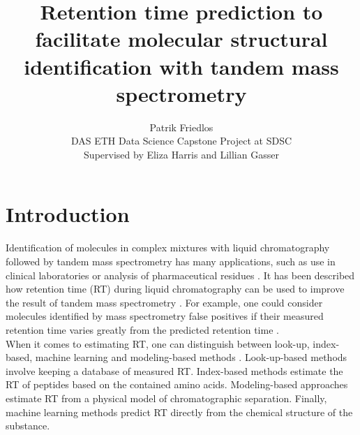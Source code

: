 \documentclass{article}
\title{Retention time prediction to facilitate molecular structural identification with tandem mass spectrometry}
\author{Patrik Friedlos\\
  \small DAS ETH Data Science Capstone Project at SDSC\\
  \small Supervised by Eliza Harris and Lillian Gasser
}
\theoremstyle{definition}
\theoremstyle{remark}
\begin{document}
\maketitle


\section{Introduction}

Identification of molecules in complex mixtures with liquid chromatography followed by tandem mass spectrometry has many applications, such as use in clinical laboratories or analysis of pharmaceutical residues \cite{van2012role, petrovic2005liquid}. It has been described how retention time (RT) during liquid chromatography can be used to improve the result of tandem mass spectrometry \cite{strittmatter2004application}. For example, one could consider molecules identified by mass spectrometry false positives if their measured retention time varies greatly from the predicted retention time \cite{yang2021prediction}.\\

When it comes to estimating RT, one can distinguish between look-up, index-based, machine learning and modeling-based methods \cite{moruz2017peptide}. Look-up-based methods involve keeping a database of measured RT. Index-based methods estimate the RT of peptides based on the contained amino acids. Modeling-based approaches estimate RT from a physical model of chromatographic separation. Finally, machine learning methods predict RT directly from the chemical structure of the substance.\\
\end{document}
